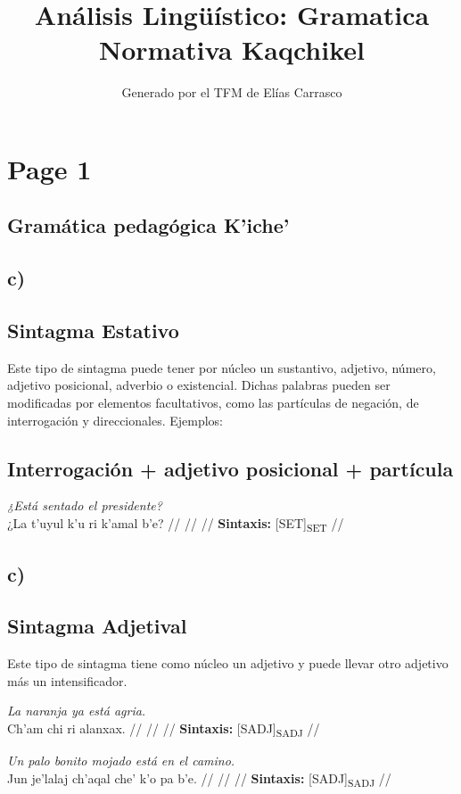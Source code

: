 \documentclass{article}%
\title{Análisis Lingüístico: Gramatica Normativa Kaqchikel}%
\author{Generado por el TFM de Elías Carrasco}%
\begin{document}
%
\normalsize%
\maketitle%
\section{Page 1}%
\label{sec:Page1}%
\subsection{Gramática pedagógica K'iche'}%
\label{subsec:GramticapedaggicaKiche}%

%
\subsection{c)}%
\label{subsec:c)}%

%
\subsection{Sintagma Estativo}%
\label{subsec:SintagmaEstativo}%

%
Este tipo de sintagma puede tener por núcleo un sustantivo, adjetivo, número, adjetivo %
posicional, adverbio o existencial. Dichas palabras pueden ser modificadas por %
elementos facultativos, como las partículas de negación, de interrogación y direccionales. %
Ejemplos: %
\subsection{Interrogación + adjetivo posicional + partícula}%
\label{subsec:Interrogacin+adjetivoposicional+partcula}%

%
\par\medskip%
\ex
\textit{¿Está sentado el presidente?} \\
\begingl
\gla ¿La t’uyul k’u ri k’amal b'e? //
\glb  //
\glc  //
\glft \textbf{Sintaxis:} [SET]\textsubscript{SET} //
\endgl
\xe
%
\medskip%
\subsection{c)}%
\label{subsec:c)}%

%
\subsection{Sintagma Adjetival}%
\label{subsec:SintagmaAdjetival}%

%
Este tipo de sintagma tiene como núcleo un adjetivo y puede llevar otro adjetivo más un %
intensificador. %
\par\medskip%
\ex
\textit{La naranja ya está agria.} \\
\begingl
\gla Ch'am chi ri alanxax. //
\glb  //
\glc  //
\glft \textbf{Sintaxis:} [SADJ]\textsubscript{SADJ} //
\endgl
\xe
%
\medskip%
\par\medskip%
\ex
\textit{Un palo bonito mojado está en el camino.} \\
\begingl
\gla Jun je’lalaj ch’aqal che' k'o pa b’e. //
\glb  //
\glc  //
\glft \textbf{Sintaxis:} [SADJ]\textsubscript{SADJ} //
\endgl
\xe
%
\medskip%
\end{document}
